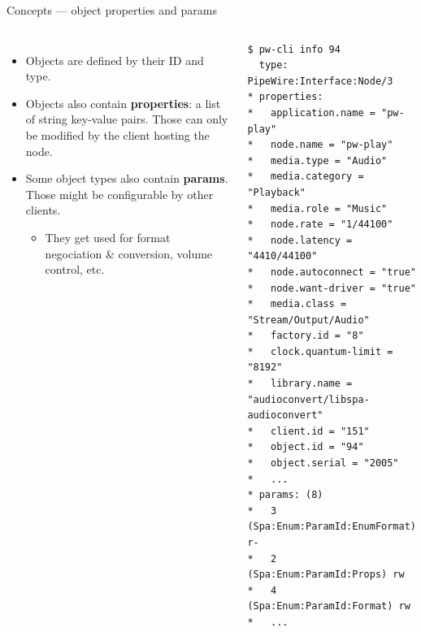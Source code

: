 \begin{frame}[fragile]{Concepts — object properties and params}
  \begin{columns}

      \begin{itemize}

      \item Objects are defined by their ID and type.

      \item Objects also contain \textbf{properties}: a list of string
        key-value pairs. Those can only be modified by the client
        hosting the node.

      \item Some object types also contain \textbf{params}. Those might
        be configurable by other clients.

        \begin{itemize}
        \item They get used for format negociation \& conversion,
          volume control, etc.
        \end{itemize}

      \end{itemize}

    \begin{block}{}
      \fontsize{7}{7}\selectfont
        \begin{verbatim}
$ pw-cli info 94
  type: PipeWire:Interface:Node/3
* properties:
*   application.name = "pw-play"
*   node.name = "pw-play"
*   media.type = "Audio"
*   media.category = "Playback"
*   media.role = "Music"
*   node.rate = "1/44100"
*   node.latency = "4410/44100"
*   node.autoconnect = "true"
*   node.want-driver = "true"
*   media.class = "Stream/Output/Audio"
*   factory.id = "8"
*   clock.quantum-limit = "8192"
*   library.name = "audioconvert/libspa-audioconvert"
*   client.id = "151"
*   object.id = "94"
*   object.serial = "2005"
*   ...
* params: (8)
*   3 (Spa:Enum:ParamId:EnumFormat) r-
*   2 (Spa:Enum:ParamId:Props) rw
*   4 (Spa:Enum:ParamId:Format) rw
*   ...
        \end{verbatim}
      \end{block}

  \end{columns}
\end{frame}



